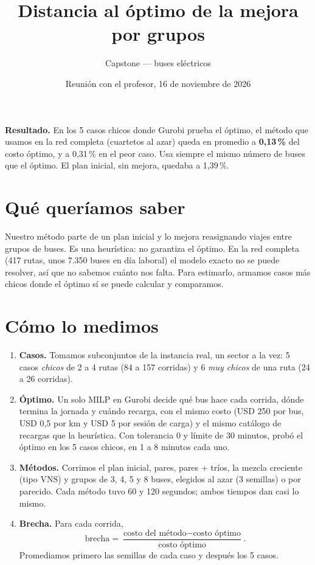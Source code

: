 \documentclass[11pt,a4paper]{article}
\title{\vspace{-1.5cm}Distancia al óptimo de la mejora por grupos}
\author{Capstone --- buses eléctricos}
\date{Reunión con el profesor, 16 de noviembre de 2026}
\begin{document}
\maketitle
\vspace{-0.6cm}

\textbf{Resultado.} En los 5 casos chicos donde Gurobi prueba el óptimo, el método que
usamos en la red completa (cuartetos al azar) queda en promedio a \textbf{0,13\,\%} del
costo óptimo, y a 0,31\,\% en el peor caso. Usa siempre el mismo número de buses que el
óptimo. El plan inicial, sin mejora, quedaba a 1,39\,\%.

\section{Qué queríamos saber}
Nuestro método parte de un plan inicial y lo mejora reasignando viajes entre grupos de
buses. Es una heurística: no garantiza el óptimo. En la red completa (417 rutas, unos
7.350 buses en día laboral) el modelo exacto no se puede resolver, así que no sabemos
cuánto nos falta. Para estimarlo, armamos casos más chicos donde el óptimo sí se puede
calcular y comparamos.

\section{Cómo lo medimos}
\begin{enumerate}
  \item \textbf{Casos.} Tomamos subconjuntos de la instancia real, un sector a la vez:
    5 casos \emph{chicos} de 2 a 4 rutas (84 a 157 corridas) y 6 \emph{muy chicos} de
    una ruta (24 a 26 corridas).
  \item \textbf{Óptimo.} Un solo MILP en Gurobi decide qué bus hace cada corrida, dónde
    termina la jornada y cuándo recarga, con el mismo costo (USD 250 por bus, USD 0,5
    por km y USD 5 por sesión de carga) y el mismo catálogo de recargas que la
    heurística. Con tolerancia 0 y límite de 30 minutos, probó el óptimo en los 5 casos
    chicos, en 1 a 8 minutos cada uno.
  \item \textbf{Métodos.} Corrimos el plan inicial, pares, pares + tríos, la mezcla
    creciente (tipo VNS) y grupos de 3, 4, 5 y 8 buses, elegidos al azar (3 semillas) o
    por parecido. Cada método tuvo 60 y 120 segundos; ambos tiempos dan casi lo mismo.
  \item \textbf{Brecha.} Para cada corrida,
    \[
      \text{brecha} = \frac{\text{costo del método} - \text{costo óptimo}}{\text{costo óptimo}}.
    \]
    Promediamos primero las semillas de cada caso y después los 5 casos.
\end{enumerate}
\end{document}
